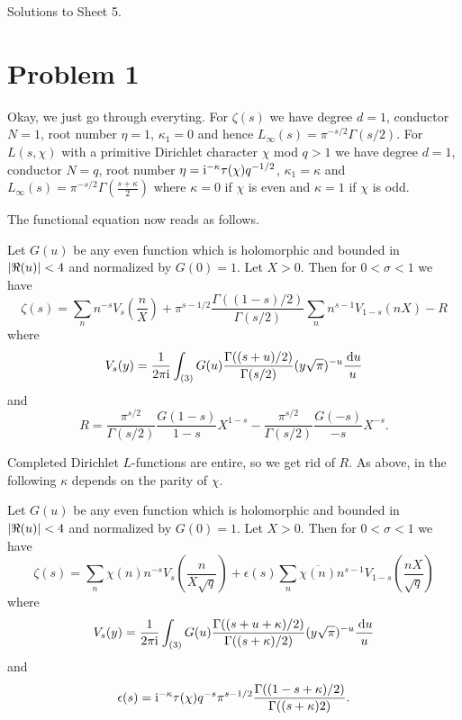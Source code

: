 \documentclass[a4paper,11pt]{article}
\author{Max von Consbruch}
\begin{document}
\begin{center}
    \huge{Solutions to Sheet 5.}
\end{center}

\section*{Problem 1}
Okay, we just go through everyting.
For $\zeta(s)$ we have degree $d=1$, conductor $N=1$, root number 
$\eta = 1$, $\kappa_1 = 0$ and hence $L_\infty(s) = \pi^{-s/2}\Gamma(s/2)$. 
For $L(s, \chi)$ with a primitive Dirichlet character $\chi$ mod $q>1$ we have
degree $d=1$, conductor $N=q$, root number $\eta = \mathrm i^{-\kappa} \tau(\chi)q^{-1/2}$,
$\kappa_1 = \kappa$ and $L_\infty(s) = \pi^{-s/2}\Gamma(\frac{s+\kappa}2)$
where $\kappa = 0$ if $\chi$ is even and $\kappa = 1$ if $\chi$ is odd. 

The functional equation now reads as follows.
\begin{thm}
    Let $G(u)$ be any even function which is holomorphic and bounded in 
    $\left\lvert \Re(u) \right\rvert < 4$ and normalized by $G(0) = 1$. Let $X>0$. Then for 
    $0 < \sigma < 1$ we have 
    \[
        \zeta(s) =
        \sum_n n^{-s} V_s \left(\frac nX \right) + 
        \pi^{s-1/2} \frac{\Gamma((1-s)/2)}{\Gamma(s/2)} \sum_n 
        n^{s-1} V_{1-s}(nX) - R
    \]
    where
    \[
        V_s(y) = \frac{1}{2 \pi \mathrm i} \int_{(3)} G(u)  \frac{\Gamma((s+u)/2)}
        {\Gamma(s/2)}(y \sqrt \pi)^{-u} \frac{\mathrm{\,d} u}u
    \]
    and
    \[
        R = \frac{\pi^{s/2}}{\Gamma(s/2)} \frac{G(1-s)}{1-s} X^{1-s}
        - \frac{\pi^{s/2}}{\Gamma(s/2)} \frac{G(-s)}{-s} X^{-s}.
    \]
\end{thm}
Completed Dirichlet $L$-functions are entire, so we get rid of $R$. 
As above, in the following $\kappa$ depends on the parity of $\chi$. 
\begin{thm}
Let $G(u)$ be any even function which is holomorphic and bounded in 
    $\left\lvert \Re(u) \right\rvert < 4$ and normalized by $G(0) = 1$. Let $X>0$. Then for 
    $0 < \sigma < 1$ we have 
    \[
        \zeta(s) =
        \sum_n \chi(n)n^{-s} V_s \left(\frac n{X\sqrt q} \right) + 
        \epsilon(s) \sum_n \overline{\chi(n)}
        n^{s-1} V_{1-s}\left(\frac{nX}{\sqrt q}\right)
    \]
    where
    \[
        V_s(y) = \frac{1}{2 \pi \mathrm i} \int_{(3)} G(u) 
        \frac{\Gamma((s+u+\kappa)/2)}
        {\Gamma((s+\kappa)/2)} (y \sqrt \pi)^{-u} \frac{\mathrm{\,d} u}u
    \]
    and
    \[
        \epsilon(s) = \mathrm i^{-\kappa} \tau(\chi) q^{-s} \pi^{s-1/2} \frac{\Gamma
        ((1-s+\kappa)/2)} {\Gamma((s+\kappa)2)}.
    \]
\end{thm}
\end{document}

